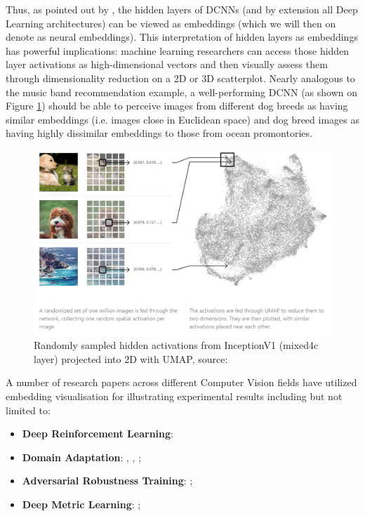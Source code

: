 \vspace{0.2cm}

Thus, as pointed out by \cite{Hohman2019VisualAI}, the hidden layers of DCNNs (and by extension all Deep Learning architectures) can be viewed as embeddings (which we will then on denote as neural embeddings). This interpretation of hidden layers as embeddings has powerful implications: machine learning researchers can access those hidden layer activations as high-dimensional vectors and then visually assess them through dimensionality reduction on a 2D or 3D scatterplot. Nearly analogous to the music band recommendation example, a well-performing DCNN (as shown on Figure \ref{fig:HRV_002_Embedding_View}) should be able to perceive images from different dog breeds as having similar embeddings (i.e. images close in Euclidean space) and dog breed images as having highly dissimilar embeddings to those from ocean promontories.

\vspace{0.2cm}

\begin{figure}[H]
	\centering
	\includegraphics[scale=0.7]{images/embedding_view/HRV_Fig_002_Embedding_View.PNG}
	\caption{Randomly sampled hidden activations from InceptionV1 (mixed4c layer) projected into 2D with UMAP, source: \cite{Carter2019}}
	\label{fig:HRV_002_Embedding_View}
\end{figure}

\vspace{0.2cm}

A number of research papers across different Computer Vision fields have utilized embedding visualisation for illustrating experimental results including but not limited to:

\begin{itemize}
	\item \textbf{Deep Reinforcement Learning}: \cite{Zahavy2016GrayingTB}
	\item \textbf{Domain Adaptation}: \cite{ganin2015domainadversarial}, \cite{Sener2016LearningTR}, \cite{Li2017RevisitingBN}; \cite{Li2018ExtractingRB}
	\item \textbf{Adversarial Robustness Training}: \cite{Chen2019ImprovingAR}; \cite{Mustafa2019AdversarialDB}
	\item \textbf{Deep Metric Learning}: \cite{Song2016DeepML}; \cite{Wang2017DeepML}
\end{itemize}

